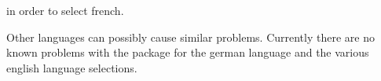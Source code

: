 \begin{Explain}
  in order to select french.

  Other languages can possibly cause similar problems. Currently there
  are no known problems with the  package for the
  german language and the various english language selections.


\end{Explain}
 
